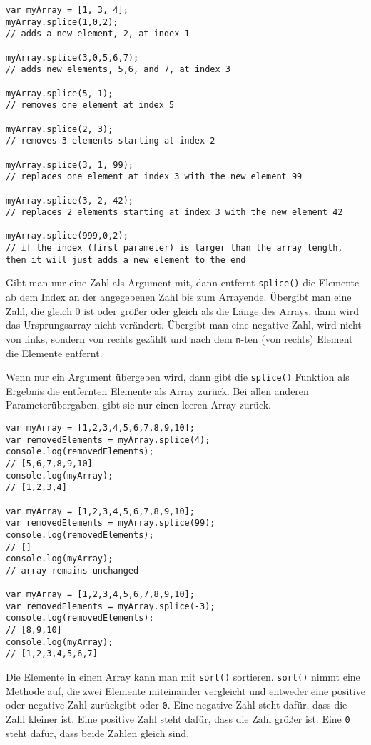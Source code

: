 \documentclass{book}
\begin{document}
\begin{lstlisting}[caption=Array Konstruktor]
var myArray = [1, 3, 4];
myArray.splice(1,0,2); 
// adds a new element, 2, at index 1

myArray.splice(3,0,5,6,7); 
// adds new elements, 5,6, and 7, at index 3

myArray.splice(5, 1); 
// removes one element at index 5

myArray.splice(2, 3); 
// removes 3 elements starting at index 2

myArray.splice(3, 1, 99); 
// replaces one element at index 3 with the new element 99

myArray.splice(3, 2, 42); 
// replaces 2 elements starting at index 3 with the new element 42

myArray.splice(999,0,2); 
// if the index (first parameter) is larger than the array length, then it will just adds a new element to the end

\end{lstlisting}

Gibt man nur eine Zahl als Argument mit, dann entfernt \lstinline|splice()| die Elemente ab dem Index an der angegebenen Zahl bis zum Arrayende. Übergibt man eine Zahl, die gleich 0 ist oder größer oder gleich als die Länge des Arrays, dann wird das Ursprungsarray nicht verändert. Übergibt man eine negative Zahl, wird nicht von links, sondern von rechts gezählt und nach dem \lstinline|n|-ten (von rechts) Element die Elemente entfernt.

Wenn nur ein Argument übergeben wird, dann gibt die \lstinline|splice()| Funktion als Ergebnis die entfernten Elemente als Array zurück. Bei allen anderen Parameterübergaben, gibt sie nur einen leeren Array zurück.

\begin{lstlisting}[caption=Array Konstruktor]
var myArray = [1,2,3,4,5,6,7,8,9,10];
var removedElements = myArray.splice(4);
console.log(removedElements);
// [5,6,7,8,9,10]
console.log(myArray);
// [1,2,3,4]

var myArray = [1,2,3,4,5,6,7,8,9,10];
var removedElements = myArray.splice(99);
console.log(removedElements);
// []
console.log(myArray);
// array remains unchanged

var myArray = [1,2,3,4,5,6,7,8,9,10];
var removedElements = myArray.splice(-3);
console.log(removedElements);
// [8,9,10]
console.log(myArray);
// [1,2,3,4,5,6,7]
\end{lstlisting}

Die Elemente in einen Array kann man mit \lstinline|sort()| sortieren. \lstinline|sort()| nimmt eine Methode auf, die zwei Elemente miteinander vergleicht und entweder eine positive oder negative Zahl zurückgibt oder \lstinline|0|. Eine negative Zahl steht dafür, dass die Zahl kleiner ist. Eine positive Zahl steht dafür, dass die Zahl größer ist. Eine \lstinline|0| steht dafür, dass beide Zahlen gleich sind.
\end{document}
